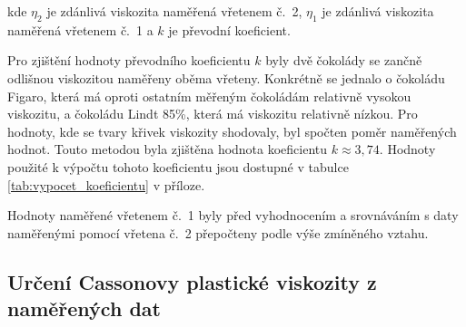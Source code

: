 \documentclass[12pt]{article}
\begin{document}
kde $\eta_2$ je zdánlivá viskozita naměřená vřetenem č.~2, $\eta_1$ je zdánlivá viskozita naměřená vřetenem č.~1 a $k$ je převodní koeficient.
\par\noindent
Pro zjištění hodnoty převodního koeficientu $k$ byly dvě čokolády se zančně odlišnou viskozitou naměřeny oběma vřeteny. Konkrétně se jednalo o čokoládu Figaro, která má oproti ostatním měřeným čokoládám relativně vysokou viskozitu, a čokoládu Lindt 85\%, která má viskozitu relativně nízkou. Pro hodnoty, kde se tvary křivek viskozity shodovaly, byl spočten poměr naměřených hodnot. Touto metodou byla zjištěna hodnota koeficientu $k\approx 3,74$. Hodnoty použité k výpočtu tohoto koeficientu jsou dostupné v tabulce \ref{tab:vypocet_koeficientu} v příloze.
\par\noindent
Hodnoty naměřené vřetenem č.~1 byly před vyhodnocením a srovnáváním s daty naměřenými pomocí vřetena č.~2 přepočteny podle výše zmíněného vztahu.

\subsection{Určení Cassonovy plastické viskozity z naměřených dat}
\end{document}
